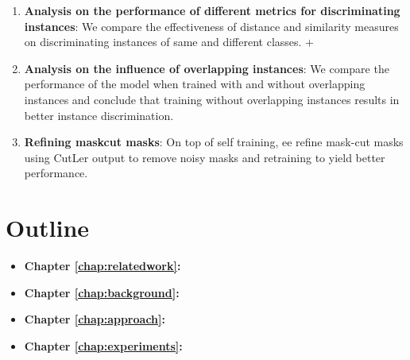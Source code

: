 \begin{enumerate}
    \item \textbf{Analysis on the performance of different metrics for discriminating instances}: We compare the effectiveness of distance and similarity measures on discriminating instances of same and different classes.
    +
    \item \textbf{Analysis on the influence of overlapping instances}: We compare the performance of the model when trained with and without overlapping instances and conclude that training without overlapping instances results in better instance discrimination.

    \item \textbf{Refining maskcut masks}: On top of self training, ee refine mask-cut masks using CutLer output to remove noisy masks and retraining to yield better performance.
\end{enumerate}


\section{Outline}
\begin{itemize}
    \item \textbf{Chapter \ref{chap:relatedwork}:} %
    
    \item \textbf{Chapter \ref{chap:background}:} %
    
    \item \textbf{Chapter \ref{chap:approach}:} %
    
    \item \textbf{Chapter \ref{chap:experiments}:} %
\end{itemize}